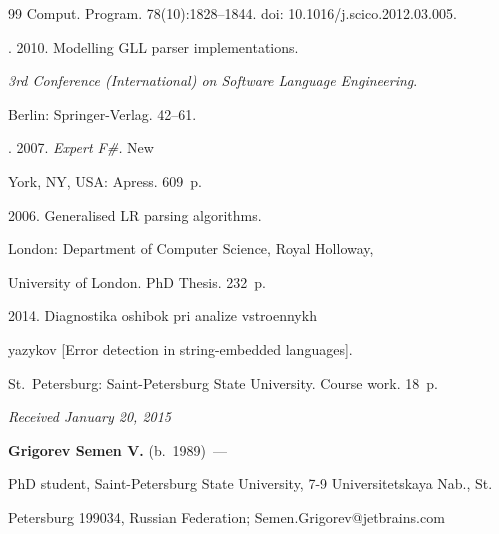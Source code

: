 {{\begin{thebibliography}{99}
{Comput. Program.} 78(10):1828--1844. doi: 10.1016/j.scico.2012.03.005.




. 2010. Modelling GLL parser implementations.


\textit{3rd Conference (International) on Software Language Engineering}.


Berlin: Springer-Verlag. 42--61.




. 2007. \textit{Expert F\#.} New


York, NY, USA: Apress. 609~p.




 2006. Generalised LR parsing algorithms.


London: Department of Computer Science, Royal Holloway,


  University of London.  PhD Thesis. 232~p.




 2014. Diagnostika oshibok pri analize vstroennykh


yazykov [Error detection in string-embedded languages].


St.\ Petersburg: Saint-Petersburg State University. Course work. 18~p.


\end{thebibliography}


} }








\vspace*{-6pt}





\hfill{\small\textit{Received January 20, 2015}}





\Contr





\noindent


\textbf{Grigorev Semen V.} (b.\ 1989)~---


PhD student, Saint-Petersburg State University, 7-9 Universitetskaya Nab., St.\


Petersburg 199034, Russian Federation; Semen.Grigorev@jetbrains.com





